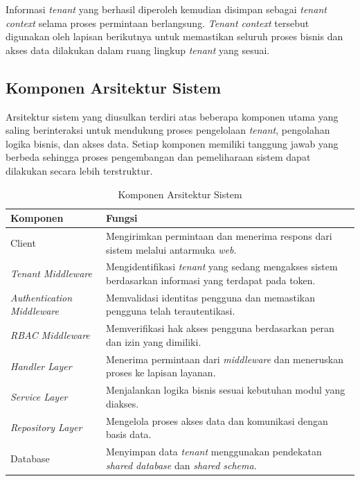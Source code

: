 Informasi \textit{tenant} yang berhasil diperoleh kemudian disimpan sebagai \textit{tenant context} selama proses permintaan berlangsung. \textit{Tenant context} tersebut digunakan oleh lapisan berikutnya untuk memastikan seluruh proses bisnis dan akses data dilakukan dalam ruang lingkup \textit{tenant} yang sesuai.

\subsection{Komponen Arsitektur Sistem}

Arsitektur sistem yang diusulkan terdiri atas beberapa komponen utama yang saling berinteraksi untuk mendukung proses pengelolaan \textit{tenant}, pengolahan logika bisnis, dan akses data. Setiap komponen memiliki tanggung jawab yang berbeda sehingga proses pengembangan dan pemeliharaan sistem dapat dilakukan secara lebih terstruktur.

\begin{table}[H]
  \centering
  \caption{Komponen Arsitektur Sistem}
  \label{tab:komponen_arsitektur}
  \begin{tabular}{|p{4cm}|p{9cm}|}
    \hline
    \rowcolor[HTML]{EFEFEF}
    \textbf{Komponen} & \textbf{Fungsi} \\
    \hline
    Client & Mengirimkan permintaan dan menerima respons dari sistem melalui antarmuka \textit{web}. \\
    \hline
    \textit{Tenant Middleware} & Mengidentifikasi \textit{tenant} yang sedang mengakses sistem berdasarkan informasi yang terdapat pada token. \\
    \hline
    \textit{Authentication Middleware} & Memvalidasi identitas pengguna dan memastikan pengguna telah terautentikasi. \\
    \hline
    \textit{RBAC Middleware} & Memverifikasi hak akses pengguna berdasarkan peran dan izin yang dimiliki. \\
    \hline
    \textit{Handler Layer} & Menerima permintaan dari \textit{middleware} dan meneruskan proses ke lapisan layanan. \\
    \hline
    \textit{Service Layer} & Menjalankan logika bisnis sesuai kebutuhan modul yang diakses. \\
    \hline
    \textit{Repository Layer} & Mengelola proses akses data dan komunikasi dengan basis data. \\
    \hline
    Database & Menyimpan data \textit{tenant} menggunakan pendekatan \textit{shared database} dan \textit{shared schema}. \\
    \hline
  \end{tabular}
\end{table}

